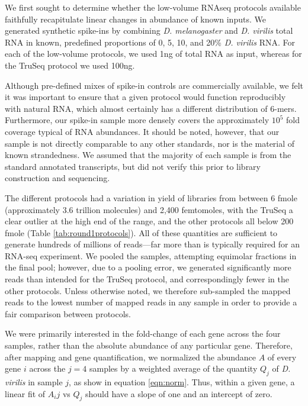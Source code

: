 We first sought to determine whether the low-volume RNAseq protocols available faithfully recapitulate linear changes in abundance of known inputs. We generated synthetic spike-ins by combining {\em D. melanogaster} and {\em D. virilis} total RNA in known, predefined proportions of 0, 5, 10, and 20\% {\em D. virilis} RNA. For each of the low-volume protocols, we used 1ng of total RNA as input, whereas for the TruSeq protocol we used 100ng.

Although pre-defined mixes of spike-in controls are commercially available, we felt it was important to ensure that a given protocol would function reproducibly with natural RNA, which almost certainly has a different distribution of 6-mers. Furthermore, our spike-in sample more densely covers the approximately $10^5$ fold coverage typical of RNA abundances.  It should be noted, however, that our sample is not directly comparable to any other standards, nor is the material of known strandedness.  We assumed that the majority of each sample is from the standard annotated transcripts, but did not verify this prior to library construction and sequencing.

The different protocols had a variation in yield of libraries from between 6 fmole (approximately 3.6 trillion molecules) and 2,400 femtomoles, with the TruSeq a clear outlier at the high end of the range, and the other protocols all below 200 fmole (Table \ref{tab:round1protocols}).  All of these quantities are sufficient to generate hundreds of millions of reads---far more than is typically required for an RNA-seq experiment. We pooled the samples, attempting equimolar fractions in the final pool; however, due to a pooling error, we generated significantly more reads than intended for the TruSeq protocol, and correspondingly fewer in the other protocols. Unless otherwise noted, we therefore sub-sampled the mapped reads to the lowest number of mapped reads in any sample in order to provide a fair comparison between protocols. 

We were primarily interested in the fold-change of each gene across the four samples, rather than the absolute abundance of any particular gene. Therefore, after mapping and gene quantification, we normalized the abundance $A$ of every gene $i$ across the $j=4$ samples by a weighted average of the quantity $Q_j$ of {\em D. virilis} in sample $j$, as show in equation \ref{eqn:norm}.  Thus, within a given gene, a linear fit of $A_ij$ vs $Q_j$ should have a slope of one and an intercept of zero.

